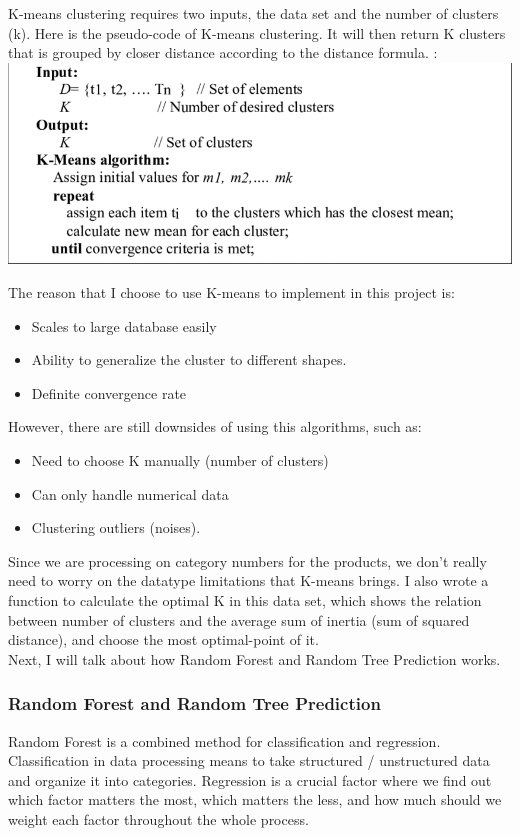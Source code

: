 \documentclass{article}
\begin{document}
K-means clustering requires two inputs, the data set and the number of clusters (k). Here is the pseudo-code of K-means clustering. It will then return K clusters that is grouped by closer distance according to the distance formula. \cite{K-means}: \\
\includegraphics[width=\textwidth]{images/KmeansP.png}

The reason that I choose to use K-means to implement in this project is:
\begin{itemize}
  \item Scales to large database easily
  \item Ability to generalize the cluster to different shapes. 
  \item Definite convergence rate
\end{itemize}
However, there are still downsides of using this algorithms, such as:
\begin{itemize}
  \item Need to choose K manually (number of clusters)
  \item Can only handle numerical data
  \item Clustering outliers (noises).
\end{itemize}
Since we are processing on category numbers for the products, we don't really need to worry on the datatype limitations that K-means brings. I also wrote a function to calculate the optimal K in this data set, which shows the relation between number of clusters and the average sum of inertia (sum of squared distance), and choose the most optimal-point of it.\\
Next, I will talk about how Random Forest and Random Tree Prediction works.

\subsubsection{Random Forest and Random Tree Prediction}
Random Forest is a combined method for classification and regression. Classification in data processing means to take structured / unstructured data and organize it into categories. Regression is a crucial factor where we find out which factor matters the most, which matters the less, and how much should we weight each factor throughout the whole process.\\
\end{document}
